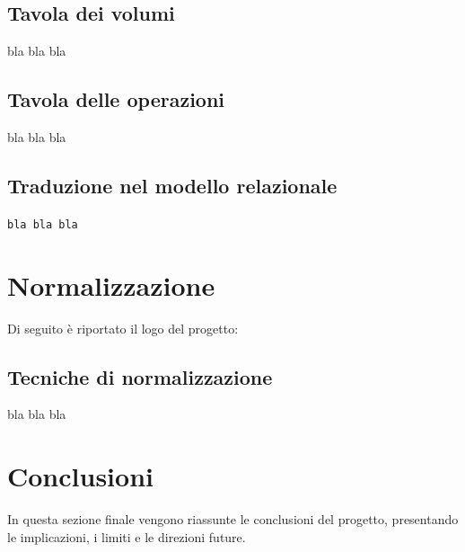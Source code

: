 \documentclass[12pt,a4paper]{article}
\begin{document}
    \subsection{Tavola dei volumi}
    bla bla bla
    \subsection{Tavola delle operazioni}
    bla bla bla
    \subsection{Traduzione nel modello relazionale}
    \texttt{bla bla bla}
    
    \newpage
    \section{Normalizzazione}
    Di seguito è riportato il logo del progetto:
    \subsection{Tecniche di normalizzazione}
    bla bla bla

    \section{Conclusioni}
    In questa sezione finale vengono riassunte le conclusioni del progetto, presentando le implicazioni, i limiti e le direzioni future.
\end{document}
